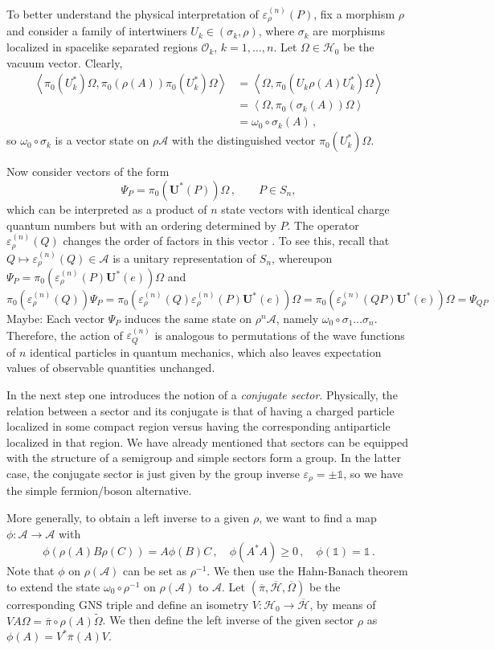 \documentclass[12pt]{article}
\newcommand{\1}{\mathds{1}}                         %
\newcommand{\Hcal}{\mathcal {H}}
\newcommand{\Ocal}{\mathcal{O}}
\newcommand{\Ac}{{\mathcal{A}}}
\begin{document}
To better understand the physical interpretation of $\varepsilon^{(n)}_\rho(P)$, fix a morphism $\rho$ and consider a family of intertwiners $U_k\in(\sigma_k,\rho)$, where $\sigma_k$ are morphisms localized in spacelike separated regions $\Ocal_k$, $k=1,\dots,n$. Let $\Omega\in\Hcal_0$ be 
the vacuum vector. Clearly,
\begin{align*}
\left<\pi_0(U_k^*)\Omega,\pi_0(\rho(A)) \pi_0(U_k^*)\Omega\right>
  &=\left<\Omega,\pi_0(U_k\rho(A)U_k^*)\Omega\right>\\
  &=\left<\Omega,\pi_0(\sigma_k(A)) \Omega\right>\\
  &=\omega_0\circ \sigma_k(A)\,,
\end{align*}
so $\omega_0\circ\sigma_k$ is a vector state on $\rho\Ac$ with the distinguished vector $\pi_0(U_k^*)\Omega$.

Now consider vectors of the form
\[
\Psi_P=\pi_0(\boldsymbol{U}^*(P))\Omega\,, \qquad P\in S_n,
\]
which can be interpreted as a product of $n$ state vectors with
identical charge quantum numbers but with an ordering determined by $P$. The operator  $\varepsilon^{(n)}_\rho(Q)$ changes the order of factors in this vector \cite{DHR3}. To see this, recall that
$Q\mapsto \varepsilon^{(n)}_\rho(Q)\in\Ac$ is a unitary representation of $S_n$, whereupon $\Psi_P=\pi_0( \varepsilon^{(n)}_\rho(P)  \boldsymbol{U}^*(e))\Omega$ and
\[\pi_0( \varepsilon^{(n)}_\rho(Q))\Psi_P=\pi_0(\varepsilon^{(n)}_\rho(Q) \varepsilon^{(n)}_\rho(P)\boldsymbol{U}^*(e))\Omega = \pi_0(\varepsilon^{(n)}_\rho(QP)\boldsymbol{U}^*(e))\Omega=\Psi_{QP}
\]
Maybe: Each vector $\Psi_P$ induces the same state on $\rho^n\Ac$, namely $\omega_0\circ \sigma_1\dots\sigma_n$. Therefore, the action of $\varepsilon^{(n)}_Q$ is analogous to permutations of the wave functions of $n$ identical particles in quantum mechanics, which also leaves expectation values of observable quantities unchanged.

In the next step one introduces the notion of a \emph{conjugate sector}. Physically, the relation between a sector and its conjugate is that of having a charged particle localized in some compact region versus having the corresponding antiparticle localized in that region. We have already mentioned that sectors can be equipped with the structure of a semigroup and simple sectors form a group. In the latter case, the conjugate sector is just given by the group inverse $\varepsilon_\rho=\pm \1$, so we have the simple fermion/boson alternative.

More generally, to  obtain a left inverse to a given $\rho$, we want to find a map $\phi:\Ac\rightarrow \Ac$ with
\[
\phi(\rho(A)B\rho(C))=A\phi(B)C\,,\quad \phi(A^*A)\geq0\,,\quad \phi(\1)=\1\,.
\]
Note that $\phi$ on $\rho(\Ac)$ can be set as $\rho^{-1}$. We then use the Hahn-Banach theorem to extend the state $\omega_0\circ \rho^{-1}$ on $\rho(\Ac)$ to $\Ac$. Let $(\overline{\pi},\overline{\Hcal}, \overline{\Omega})$ be the corresponding GNS triple and define an isometry $V:\Hcal_{0}\rightarrow \overline{\Hcal}$, by means of
$VA\Omega=\overline{\pi}\circ \rho(A)\tilde{\Omega}$. We then define the left inverse of the given sector $\rho$ as $\phi(A)=V^* \overline{\pi}(A) V$. 
\end{document}

